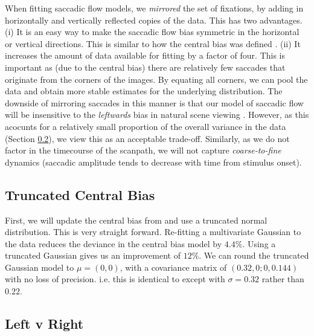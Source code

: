 When fitting saccadic flow models, we \textit{mirrored} the set of fixations, by adding in horizontally and vertically reflected copies of the data. This has two advantages. (i) It is an easy way to make the saccadic flow bias symmetric in the horizontal or vertical directions. This is similar to how the central bias was defined \cite{clarke-tatler2014}. (ii) It increases the amount of data available for fitting by a factor of four. This is important as (due to the central bias) there are relatively few saccades that originate from the corners of the images. By equating all corners, we can pool the data and obtain more stable estimates for the underlying distribution. The downside of mirroring saccades in this manner is that our model of saccadic flow will be insensitive to the \textit{leftwards} bias in natural scene viewing \citep{nuthmann-matthias2014}. However, as this acocunts for a relatively small proportion of the overall variance in the data (Section \ref{sec:LeftRight}), we view this as an acceptable trade-off. Similarly, as we do not factor in the timecourse of the scanpath, we will not capture \textit{coarse-to-fine} dynamics (saccadic amplitude tends to decrease with time from stimulus onset).


\subsection{Truncated Central Bias}
\label{sec:truncatedCentral}

First, we will update the central bias from \cite{clarke-tatler2014} and use a truncated normal distribution. This is very straight forward. Re-fitting a multivariate Gaussian to the data reduces the deviance in the central bias model by $4.4\%$. Using a truncated Gaussian gives us an improvement of $12\%$. We can round the truncated Gaussian model to $\mu = (0,0)$, with a covariance matrix of $(0.32, 0; 0, 0.144)$ with no loss of precision. i.e. this is identical to \cite{clarke-tatler2014} except with $\sigma=0.32$ rather than $0.22$.

\subsection{Left v Right}
\label{sec:LeftRight}

